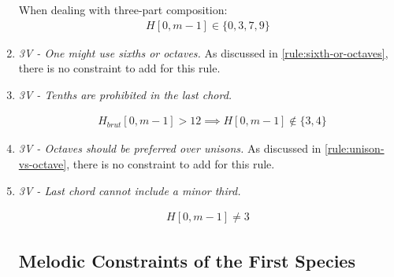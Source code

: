 \begin{enumerate}[wide, label=\bfseries 1.H\arabic*]
When dealing with three-part composition:
\begin{equation}
    \begin{aligned}
        H[0, m-1] \in \{0, 3, 7, 9\}
    \end{aligned}
\end{equation}

\item  \textit{3V - One might use sixths or octaves.}
As discussed in \ref{rule:sixth-or-octaves}, there is no constraint to add for this rule.

\item \textit{3V - Tenths are prohibited in the last chord.}

\begin{equation} \begin{aligned}
&H_{brut}[0, m-1] > 12 \implies H[0, m-1] \notin \{3, 4\}
\end{aligned} \end{equation}

\item \textit{3V - Octaves should be preferred over unisons.}
As discussed in \ref{rule:unison-vs-octave}, there is no constraint to add for this rule.

\item \textit{3V - Last chord cannot include a minor third.}

\begin{equation} \begin{aligned}
H[0, m-1] \neq 3
\end{aligned} \end{equation}

\subsection*{Melodic Constraints of the First Species}
\end{enumerate}

